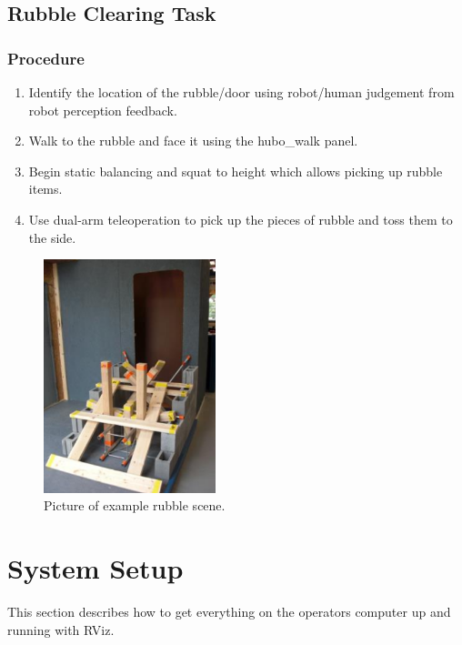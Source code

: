 \documentclass[letterpaper, 10 pt]{report}
\begin{document}
\newpage

%
\section{Rubble Clearing Task}\label{chap:rubble-clearing-task}
\subsection{Procedure}
\begin{enumerate}
\item Identify the location of the rubble/door using robot/human judgement from robot perception feedback.
\item Walk to the rubble and face it using the hubo\_walk panel.
\item Begin static balancing and squat to height which allows picking up rubble items.
\item Use dual-arm teleoperation to pick up the pieces of rubble and toss them to the side.
\end{enumerate}
\begin{figure}[ht]
  \centering
  \includegraphics[width=5.0cm]{figures/rubble-clearing}
  \caption{Picture of example rubble scene.}
  \label{fig:Rubble-image}
\end{figure}

\newpage

%

\chapter{System Setup}\label{chap:system-setup}
This section describes how to get everything on the operators computer up and running with RViz.
\end{document}
